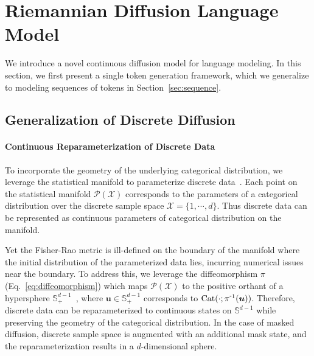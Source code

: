 \section{Riemannian Diffusion Language Model \label{sec:bridge}}

We introduce a novel continuous diffusion model for language modeling. 
In this section, we first present a single token generation framework, which we generalize to modeling sequences of tokens in Section~\ref{sec:sequence}.


\subsection{Generalization of Discrete Diffusion}

\paragraph{Continuous Reparameterization of Discrete Data}
To incorporate the geometry of the underlying categorical distribution, we leverage the statistical manifold to parameterize discrete data~\citep{cheng2024categorical,davis2024fisherflow}.
Each point on the statistical manifold $\mathcal{P}(\mathcal{X})$ corresponds to the parameters of a categorical distribution over the discrete sample space $\mathcal{X}=\{1,\cdots,d\}$.
Thus discrete data can be represented as continuous parameters of categorical distribution on the manifold.


Yet the Fisher-Rao metric is ill-defined on the boundary of the manifold 
where the initial distribution of the parameterized data lies, incurring numerical issues near the boundary.
To address this, we leverage the diffeomorphism $\pi$ (Eq.~\eqref{eq:diffeomorphism}) which maps $\mathcal{P}(\mathcal{X})$ to the positive orthant of a hypersphere $\mathbb{S}^{d-1}_{+}$~\citep{cheng2024categorical,davis2024fisherflow}, where $\bm{u}\in\mathbb{S}^{d-1}_{+}$ corresponds to $\text{Cat}(\cdot;\pi^{\scalebox{0.75}[1.0]{-}1}(\bm{u}))$.
Therefore, discrete data can be reparameterized to continuous states on $\mathbb{S}^{d-1}$ while preserving the geometry of the categorical distribution.
In the case of masked diffusion, discrete sample space is augmented with an additional mask state, and the reparameterization results in a $d$-dimensional sphere.



